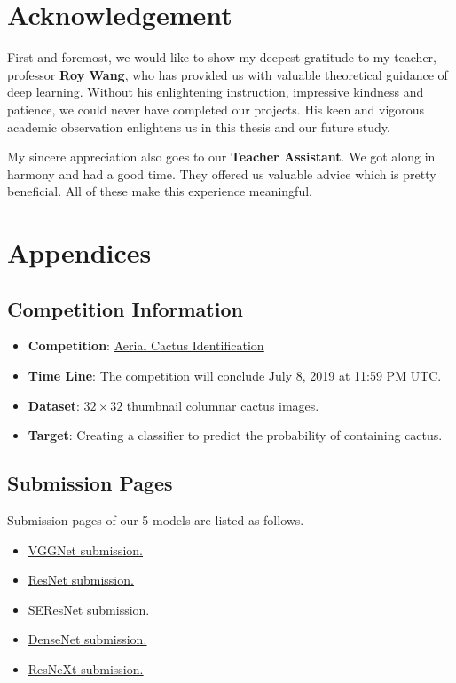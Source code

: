 \documentclass[10pt,twocolumn,letterpaper]{article}
\begin{document}
\section{Acknowledgement}

First and foremost, we would like to show my deepest gratitude to my teacher, professor \textbf{Roy Wang}, who has provided us with valuable theoretical guidance of deep learning. Without his enlightening instruction, impressive kindness and patience, we could never have completed our projects. His keen and vigorous academic observation enlightens us in this thesis and our future study.

My sincere appreciation also goes to our \textbf{Teacher Assistant}. We got along in harmony and had a good time. They offered us valuable advice which is pretty beneficial. All of these make this experience meaningful.

\section{Appendices}

\subsection{Competition Information} \label{app1}

\begin{itemize}
    \item \textbf{Competition}: \underline{\href{https://www.kaggle.com/c/aerial-cactus-identification/overview}{Aerial Cactus Identification}}
    \item \textbf{Time Line}: The competition will conclude July 8, 2019 at 11:59 PM UTC. 
    \item \textbf{Dataset}: $32 \times 32$ thumbnail columnar cactus images.
    \item \textbf{Target}: Creating a classifier to predict the probability of containing cactus.
\end{itemize}

\subsection{Submission Pages} \label{app2}

Submission pages of our 5 models are listed as follows.
\begin{itemize}
    \item  \underline{\href{https://www.kaggle.com/albertsheldon/test-m2?scriptVersionId=16988178}{\textsf{VGGNet} submission.}}
    \item  \underline{\href{https://www.kaggle.com/albertsheldon/test-resnet}{\textsf{ResNet} submission.}}
    \item \underline{\href{https://www.kaggle.com/albertsheldon/test-m2}{\textsf{SEResNet} submission.}}
    \item \underline{\href{https://www.kaggle.com/albertsheldon/test-m1?scriptVersionId=16987923}{\textsf{DenseNet} submission.}}
    \item \underline{\href{https://www.kaggle.com/albertsheldon/test-m1}{\textsf{ResNeXt} submission.}}
\end{itemize}
\end{document}
